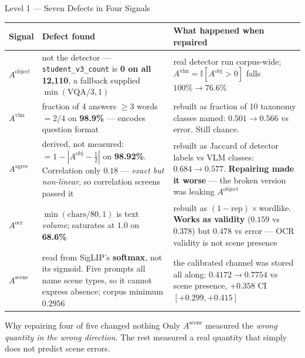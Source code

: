 \documentclass[aspectratio=169,11pt]{beamer}
\begin{document}
\begin{frame}{Level 1 --- Seven Defects in Four Signals}
\scriptsize
\begin{center}
\tiny
\begin{tabular}{@{}l p{4.1cm} p{4.5cm}@{}}
\toprule
\textbf{Signal} & \textbf{Defect found} & \textbf{What happened when repaired} \\
\midrule
$A^{\text{object}}$ & not the detector --- \texttt{student\_v3\_count} is \textbf{0 on all 12,110}, a fallback supplied $\min(\text{VQA}/3,1)$ & real detector run corpus-wide; $A^{\text{vlm}}{=}\mathbb{I}[A^{\text{obj}}{>}0]$ falls $100\% \to 76.6\%$ \\
\addlinespace
$A^{\text{vlm}}$ & fraction of 4 answers $\ge3$ words $=2/4$ on \textbf{98.9\%} --- encodes question format & rebuilt as fraction of 10 taxonomy classes named: $0.501 \to 0.566$ vs error. Still chance. \\
\addlinespace
$A^{\text{agree}}$ & derived, not measured: $=1-|A^{\text{obj}}-\tfrac12|$ on \textbf{98.92\%}. Correlation only $0.18$ --- \emph{exact but non-linear}, so correlation screens passed it & rebuilt as Jaccard of detector labels vs VLM classes: $0.684 \to \mathbf{0.577}$. \textbf{Repairing made it worse} --- the broken version was leaking $A^{\text{object}}$ \\
\addlinespace
$A^{\text{ocr}}$ & $\min(\text{chars}/80,1)$ is text \emph{volume}; saturates at $1.0$ on \textbf{68.6\%} & rebuilt as $(1-\text{rep})\times$wordlike. \textbf{Works as validity} ($0.159$ vs $0.378$) but $0.478$ vs error --- OCR validity is not scene presence \\
\addlinespace
$A^{\text{scene}}$ & read from SigLIP's \textbf{softmax}, not its sigmoid. Five prompts all name scene types, so it cannot express absence; corpus minimum $0.2956$ & the calibrated channel was stored all along: $\mathbf{0.4172 \to 0.7754}$ vs scene presence, $+0.358$ CI $[+0.299,+0.415]$ \\
\bottomrule
\end{tabular}
\end{center}
\vspace{-1mm}
\begin{alertblock}{\scriptsize Why repairing four of five changed nothing}
\scriptsize Only $A^{\text{scene}}$ measured the \emph{wrong quantity in the wrong direction}. The rest measured a real quantity that simply does not predict scene errors.
\end{alertblock}
\end{frame}
\end{document}
